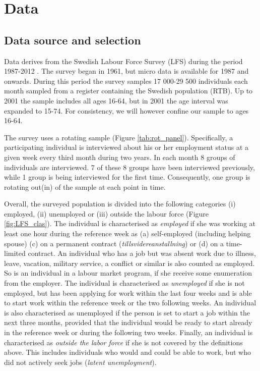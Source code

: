 \section{Data}

\subsection{Data source and selection}
Data derives from the Swedish Labour Force Survey (LFS) during the period 1987-2012 \citep{AKU2012}. The survey began in 1961, but micro data is available for 1987 and onwards. During this period the survey samples 17 000-29 500 individuals each month sampled from a register containing the Swedish population (RTB). Up to 2001 the sample includes all ages 16-64, but in 2001 the age interval was expanded to 15-74. For consistency, we will however confine our sample to ages 16-64.

The survey uses a rotating sample (Figure \ref{tab:rot_panel}). Specifically, a participating individual is interviewed about his or her employment status at a given week every third month during two years. In each month 8 groups of individuals are interviewed. 7 of these 8 groups have been interviewed previously, while 1 group is being interviewed for the first time. Consequently, one group is rotating out(in) of the sample at each point in time.

Overall, the surveyed population is divided into the following categories (i) employed, (ii) unemployed or (iii) outside the labour force (Figure \ref{fig:LFS_clas}). The individual is characterised as \textit{employed} if she was working at least one hour during the reference week as (a) self-employed (including helping spouse) (c) on a permanent contract (\textit{tillsvidereanstallning}) or (d) on a time-limited contract. An individual who has a job but was absent work due to illness, leave, vacation, military service, a conflict or similar is also counted as employed. So is an individual in a labour market program, if she receive some enumeration from the employer. The individual is characterised as \textit{unemployed} if she is not employed, but has been applying for work within the last four weeks and is able to start work within the reference week or the two following weeks. An individual is also characterised as unemployed if the person is set to start a job within the next three months, provided that the individual would be ready to start already in the reference week or during the following two weeks. Finally, an individual is characterised as \emph{outside the labor force} if she is not covered by the definitions above. This includes individuals who would and could be able to work, but who did not actively seek jobs (\textit{latent unemployment}). 

